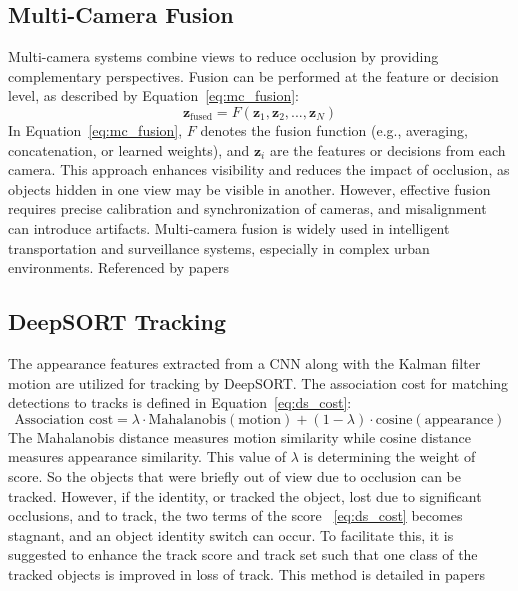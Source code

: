 \documentclass[12pt,a4paper]{report}
\theoremstyle{definition}
\theoremstyle{remark}
\begin{document}
\subsection{Multi-Camera Fusion}
Multi-camera systems combine views to reduce occlusion by providing complementary perspectives. Fusion can be performed at the feature or decision level, as described by Equation~\ref{eq:mc_fusion}:
\begin{equation}
\label{eq:mc_fusion}
\mathbf{z}_{\text{fused}} = F(\mathbf{z}_1, \mathbf{z}_2, ..., \mathbf{z}_N)
\end{equation}
In Equation~\ref{eq:mc_fusion}, $F$ denotes the fusion function (e.g., averaging, concatenation, or learned weights), and $\mathbf{z}_i$ are the features or decisions from each camera. This approach enhances visibility and reduces the impact of occlusion, as objects hidden in one view may be visible in another. However, effective fusion requires precise calibration and synchronization of cameras, and misalignment can introduce artifacts. Multi-camera fusion is widely used in intelligent transportation and surveillance systems, especially in complex urban environments. Referenced by papers \cite{paper38,paper41, paper46}

\subsection{DeepSORT Tracking}
The appearance features extracted from a CNN along with the Kalman filter motion are utilized for tracking by DeepSORT. The association cost for matching detections to tracks is defined in Equation~\ref{eq:ds_cost}:
\begin{equation}
\label{eq:ds_cost}
\text{Association cost} = \lambda \cdot \text{Mahalanobis}(\text{motion}) + (1-\lambda) \cdot \text{cosine}(\text{appearance})
\end{equation}
The Mahalanobis distance measures motion similarity while cosine distance measures appearance similarity. This value of $\lambda$ is determining the weight of score. So the objects that were briefly out of view due to occlusion can be tracked. However, if the identity, or tracked the object, lost due to significant occlusions, and to track, the two terms of the score ~\ref{eq:ds_cost} becomes stagnant, and an object identity switch can occur. To facilitate this, it is suggested to enhance the track score and track set such that one class of the tracked objects is improved in loss of track. This method is detailed in papers ~\cite{paper20, paper30,paper35} 
\end{document}
